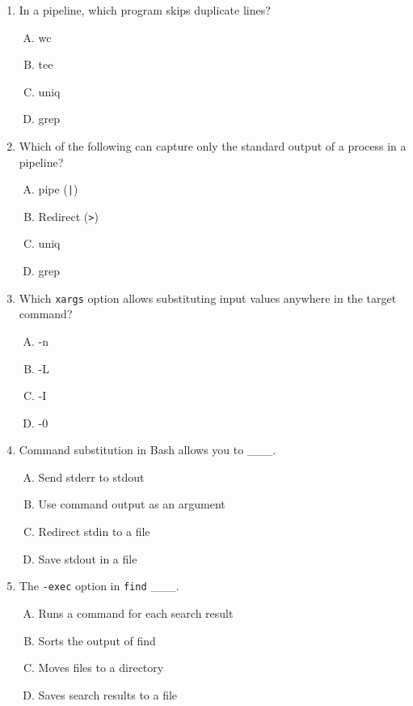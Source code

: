 \documentclass[a4paper]{report}
\begin{document}
\begin{enumerate}[1.]
    \item In a pipeline, which program skips duplicate lines?  
    \begin{enumerate}[A)]
        \item wc  
        \item tee  
        \item uniq  
        \item grep  
    \end{enumerate}

    \item Which of the following can capture only the standard output of a process in a pipeline?  
    \begin{enumerate}[A)]
        \item pipe (\texttt{|})  
        \item Redirect (\texttt{>})  
        \item uniq  
        \item grep  
    \end{enumerate}

    \item Which \texttt{xargs} option allows substituting input values anywhere in the target command?  
    \begin{enumerate}[A)]
        \item -n  
        \item -L  
        \item -I  
        \item -0  
    \end{enumerate}

    \item Command substitution in Bash allows you to \_\_\_.  
    \begin{enumerate}[A)]
        \item Send stderr to stdout  
        \item Use command output as an argument  
        \item Redirect stdin to a file  
        \item Save stdout in a file  
    \end{enumerate}

    \item The \texttt{-exec} option in \texttt{find} \_\_\_.  
    \begin{enumerate}[A)]
        \item Runs a command for each search result  
        \item Sorts the output of find  
        \item Moves files to a directory  
        \item Saves search results to a file  
    \end{enumerate}


\end{enumerate}
\end{document}
